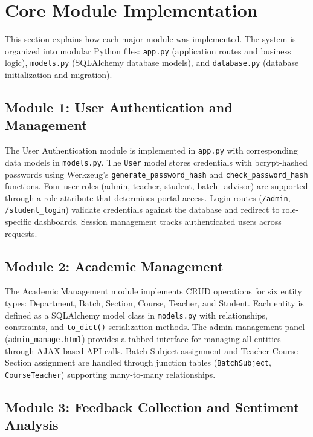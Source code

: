 
\section{Core Module Implementation}

This section explains how each major module was implemented. The system is organized into modular Python files: \texttt{app.py} (application routes and business logic), \texttt{models.py} (SQLAlchemy database models), and \texttt{database.py} (database initialization and migration).

\subsection{Module 1: User Authentication and Management}

The User Authentication module is implemented in \texttt{app.py} with corresponding data models in \texttt{models.py}. The \texttt{User} model stores credentials with bcrypt-hashed passwords using Werkzeug's \texttt{generate\_password\_hash} and \texttt{check\_password\_hash} functions. Four user roles (admin, teacher, student, batch\_advisor) are supported through a role attribute that determines portal access. Login routes (\texttt{/admin}, \texttt{/student\_login}) validate credentials against the database and redirect to role-specific dashboards. Session management tracks authenticated users across requests.

\subsection{Module 2: Academic Management}

The Academic Management module implements CRUD operations for six entity types: Department, Batch, Section, Course, Teacher, and Student. Each entity is defined as a SQLAlchemy model class in \texttt{models.py} with relationships, constraints, and \texttt{to\_dict()} serialization methods. The admin management panel (\texttt{admin\_manage.html}) provides a tabbed interface for managing all entities through AJAX-based API calls. Batch-Subject assignment and Teacher-Course-Section assignment are handled through junction tables (\texttt{BatchSubject}, \texttt{CourseTeacher}) supporting many-to-many relationships.

\subsection{Module 3: Feedback Collection and Sentiment Analysis}

